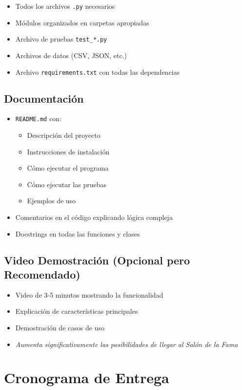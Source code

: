 \documentclass[12pt,a4paper]{article}
\begin{document}
\begin{itemize}
    \item Todos los archivos \texttt{.py} necesarios
    \item Módulos organizados en carpetas apropiadas
    \item Archivo de pruebas \texttt{test\_*.py}
    \item Archivos de datos (CSV, JSON, etc.)
    \item Archivo \texttt{requirements.txt} con todas las dependencias
\end{itemize}

\subsection{Documentación}

\begin{itemize}
    \item \texttt{README.md} con:
    \begin{itemize}
        \item Descripción del proyecto
        \item Instrucciones de instalación
        \item Cómo ejecutar el programa
        \item Cómo ejecutar las pruebas
        \item Ejemplos de uso
    \end{itemize}
    \item Comentarios en el código explicando lógica compleja
    \item Docstrings en todas las funciones y clases
\end{itemize}

\subsection{Video Demostración (Opcional pero Recomendado)}

\begin{itemize}
    \item Video de 3-5 minutos mostrando la funcionalidad
    \item Explicación de características principales
    \item Demostración de casos de uso
    \item \textit{Aumenta significativamente las posibilidades de llegar al Salón de la Fama}
\end{itemize}

\section{Cronograma de Entrega}
\end{document}
